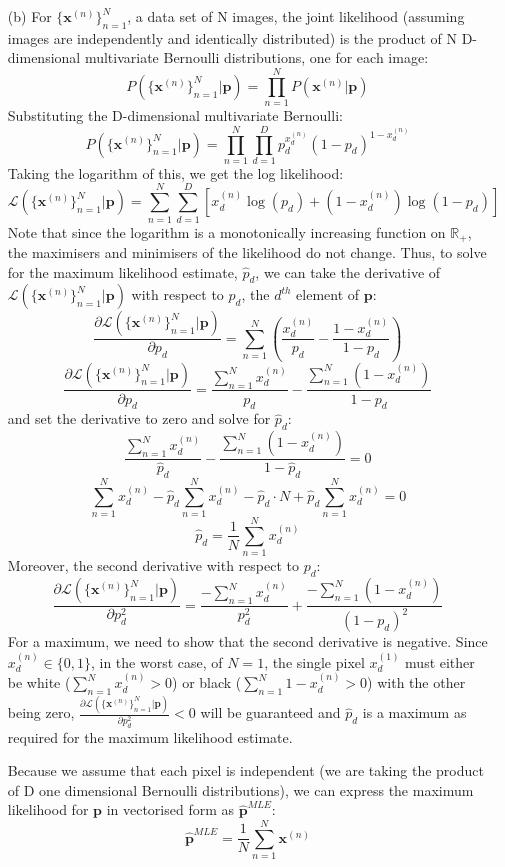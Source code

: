 \documentclass[12pt]{article}
\begin{document}
\begin{enumerate}
\item[(b)] For $\{\textbf{x}^{(n)}\}_{n=1}^N$, a data set of N images, the joint likelihood (assuming images are independently and identically distributed) is the product of N D-dimensional multivariate Bernoulli distributions, one for each image:
$$P(\{\textbf{x}^{(n)}\}_{n=1}^N|\textbf{p}) = \prod_{n=1}^N P(\textbf{x}^{(n)} | \textbf{p})$$
Substituting the D-dimensional multivariate Bernoulli:
$$P(\{\textbf{x}^{(n)}\}_{n=1}^N|\textbf{p}) = \prod_{n=1}^{N}\prod_{d=1}^{D} p_d^{x_d^{(n)}} (1-p_d)^{1-x_d^{(n)}}$$
Taking the logarithm of this, we get the log likelihood:
$$\mathcal{L}(\{\textbf{x}^{(n)}\}_{n=1}^N|\textbf{p}) = \sum_{n=1}^{N}\sum_{d=1}^{D} [x_d^{(n)}\log(p_d) +  (1-x_d^{(n)})\log(1-p_d)]$$
Note that since the logarithm is a monotonically increasing function on $\mathbb{R}_+$, the maximisers and minimisers of the likelihood do not change.
Thus, to solve for the maximum likelihood estimate, $\hat p_d$, we can take the derivative of $\mathcal{L}(\{\textbf{x}^{(n)}\}_{n=1}^N|\textbf{p})$ with respect to $p_d$, the $d^{th}$ element of $\textbf{p}$:
$$\frac{\partial\mathcal{L}(\{\textbf{x}^{(n)}\}_{n=1}^N|\textbf{p})}{\partial p_d} = \sum_{n=1}^{N} (\frac{x_d^{(n)}}{p_d} -  \frac{1-x_d^{(n)}}{1-p_d})$$
$$\frac{\partial\mathcal{L}(\{\textbf{x}^{(n)}\}_{n=1}^N|\textbf{p})}{\partial p_d} = \frac{\sum_{n=1}^{N} x_d^{(n)}}{p_d} -  \frac{\sum_{n=1}^{N} (1-x_d^{(n)})}{1-p_d}$$
and set the derivative to zero and solve for $\hat p_d$:
$$\frac{\sum_{n=1}^{N} x_d^{(n)}}{\hat p_d} -  \frac{\sum_{n=1}^{N} (1-x_d^{(n)})}{1-\hat p_d} = 0$$
$$ \sum_{n=1}^{N} x_d^{(n)} - \hat p_d\sum_{n=1}^{N} x_d^{(n)} - \hat p_d  \cdot N + \hat p_d \sum_{n=1}^{N}x_d^{(n)} = 0$$
$$  \hat p_d = \frac{1}{N}\sum_{n=1}^{N} x_d^{(n)}$$
Moreover, the second derivative with respect to $p_d$:
$$\frac{\partial\mathcal{L}(\{\textbf{x}^{(n)}\}_{n=1}^N|\textbf{p})}{\partial p_d^2} = \frac{-\sum_{n=1}^{N} x_d^{(n)}}{p_d^2} +  \frac{-\sum_{n=1}^{N} (1-x_d^{(n)})}{(1-p_d)^2}$$
For a maximum, we need to show that the second derivative is negative.
Since $x_d^{(n)} \in \{0, 1\}$, in the worst case, of $N=1$, the single pixel $x_d^{(1)}$ must either be white ($\sum_{n=1}^{N} x_d^{(n)}> 0$) or black ($\sum_{n=1}^{N} 1-x_d^{(n)} > 0$) with the other being zero,  $\frac{\partial\mathcal{L}(\{\textbf{x}^{(n)}\}_{n=1}^N|\textbf{p})}{\partial p_d^2} < 0$ will be guaranteed and $\hat p_d$ is a maximum as required for the maximum likelihood estimate.

Because we assume that each pixel is independent (we are taking the product of D one dimensional Bernoulli distributions), we can express the maximum likelihood for $\textbf{p}$ in vectorised form as $\hat{\textbf{p}}^{MLE}$:
$$\hat{\textbf{p}}^{MLE} = \frac{1}{N}\sum_{n=1}^{N} \textbf{x}^{(n)}$$


\end{enumerate}
\end{document}
